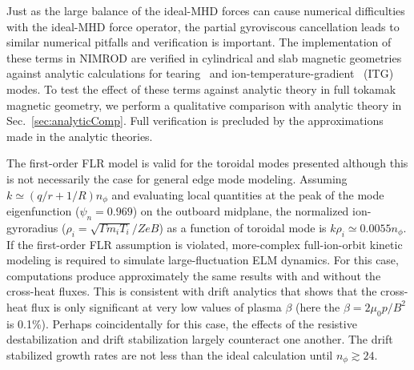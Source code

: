 Just as the large balance of the ideal-MHD forces can cause
numerical difficulties with the ideal-MHD force operator, the
partial gyroviscous cancellation leads to similar numerical 
pitfalls and verification is important.
The implementation of these terms in NIMROD are verified in cylindrical and
slab magnetic geometries against analytic calculations for
tearing~\cite{Sovinec10,King11,King14} and
ion-temperature-gradient~\cite{Schnack13} (ITG) modes. 
To test the effect of these terms against analytic theory
in full tokamak magnetic geometry, we perform a qualitative
comparison with analytic theory in Sec.~\ref{sec:analyticComp}.
Full verification is precluded by the approximations
made in the analytic theories.

The first-order FLR model is valid for the toroidal modes presented although
this is not necessarily the case for general edge mode modeling.  Assuming
$k\simeq(q/r+1/R)n_\phi$ and evaluating local quantities at the peak of the
mode eigenfunction ($\psi_n = 0.969$) on the outboard midplane, the normalized
ion-gyroradius ($\rho_i=\sqrt{\Gamma m_i T_i}/ZeB$) as a function of toroidal
mode is $k \rho_i \simeq 0.0055n_\phi$.  If the first-order FLR assumption is
violated, more-complex full-ion-orbit kinetic modeling is required to simulate
large-fluctuation ELM dynamics.  For this case, computations produce
approximately the same results with and without the cross-heat fluxes.  This is
consistent with drift analytics \cite{King14} that shows that the cross-heat
flux is only significant at very low values of plasma $\beta$ (here the
$\beta=2\mu_0p/B^2$ is 0.1\%).  Perhaps coincidentally for this case, the
effects of the resistive destabilization and drift stabilization largely
counteract one another. The drift stabilized growth rates are not less than the
ideal calculation until $n_\phi \gtrsim 24$.  

